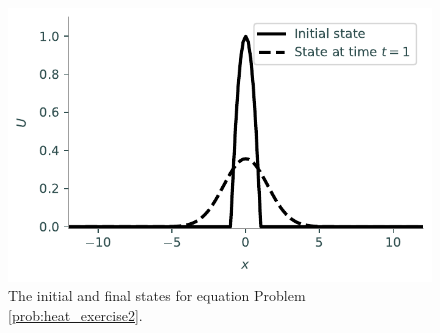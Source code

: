 \begin{figure}
\centering
\includegraphics[width=\textwidth]{figures/heatexercise2.pdf}
\caption{The initial and final states for equation Problem \ref{prob:heat_exercise2}.}
\label{fig:heatexercise2}
\end{figure}

